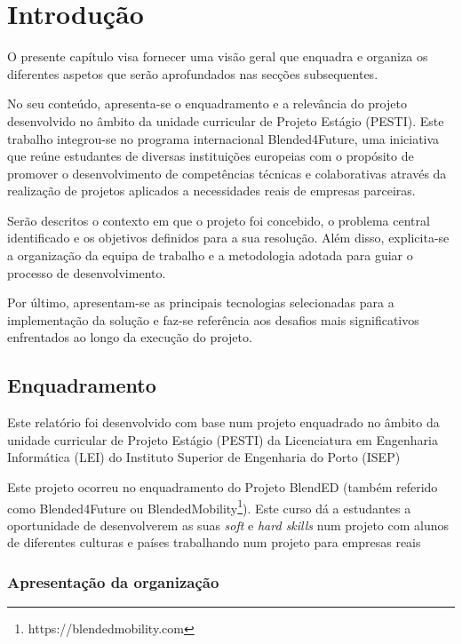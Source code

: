 \chapter{Introdução}
\label{chap:introducao}

O presente capítulo visa fornecer uma visão geral que enquadra e organiza os diferentes aspetos que serão aprofundados nas secções subsequentes.

No seu conteúdo, apresenta-se o enquadramento e a relevância do projeto desenvolvido no âmbito da unidade curricular de Projeto Estágio (PESTI). Este trabalho integrou-se no programa internacional Blended4Future, uma iniciativa que reúne estudantes de diversas instituições europeias com o propósito de promover o desenvolvimento de competências técnicas e colaborativas através da realização de projetos aplicados a necessidades reais de empresas parceiras.

Serão descritos o contexto em que o projeto foi concebido, o problema central identificado e os objetivos definidos para a sua resolução. Além disso, explicita-se a organização da equipa de trabalho e a metodologia adotada para guiar o processo de desenvolvimento.

Por último, apresentam-se as principais tecnologias selecionadas para a implementação da solução e faz-se referência aos desafios mais significativos enfrentados ao longo da execução do projeto.



\section{Enquadramento}
\label{sec:introducao_enquadramento}

Este relatório foi desenvolvido com base num projeto enquadrado no âmbito da unidade curricular de Projeto Estágio (PESTI) da Licenciatura em Engenharia Informática (LEI) do Instituto Superior de Engenharia do Porto (ISEP)

Este projeto ocorreu no enquadramento do Projeto BlendED (também referido como Blended4Future ou BlendedMobility\footnote{https://blendedmobility.com}). Este curso dá a estudantes a oportunidade de desenvolverem as suas \textit{soft} e \textit{hard skills} num projeto com alunos de diferentes culturas e países trabalhando num projeto para empresas reais

\subsection{Apresentação da organização}


